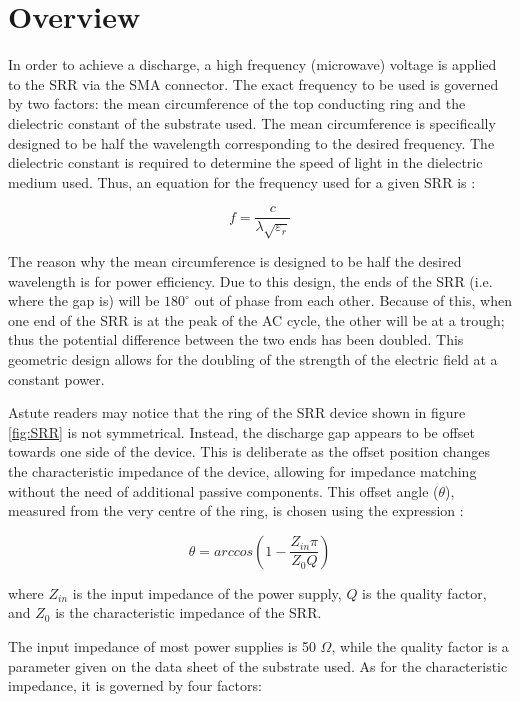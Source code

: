 \section{Overview}


In order to achieve a discharge, a high frequency (microwave) voltage is applied to the SRR via the SMA connector. The exact frequency to be used is governed by two factors: the mean circumference of the top conducting ring and the dielectric constant of the substrate used. The mean circumference is specifically designed to be half the wavelength corresponding to the desired frequency. The dielectric constant is required to determine the speed of light in the dielectric medium used. Thus, an equation for the frequency used for a given SRR is \cite{Dextre2017}:

\begin{equation}
     f = \frac{c}{\lambda\sqrt{\varepsilon_r}}
     \label{eq:resonant_frequency}
\end{equation}

The reason why the mean circumference is designed to be half the desired wavelength is for power efficiency. Due to this design, the ends of the SRR (i.e. where the gap is) will be $180^\circ$ out of phase from each other. Because of this, when one end of the SRR is at the peak of the AC cycle, the other will be at a trough; thus the potential difference between the two ends has been doubled. This geometric design allows for the doubling of the strength of the electric field at a constant power. 

Astute readers may notice that the ring of the SRR device shown in figure \ref{fig:SRR} is not symmetrical. Instead, the discharge gap appears to be offset towards one side of the device. This is deliberate as the offset position changes the characteristic impedance of the device, allowing for impedance matching without the need of additional passive components. This offset angle ($\theta$),  measured from the very centre of the ring, is chosen using the expression \cite{Iza2005}:

\begin{equation}
	\theta = arccos(1 - \frac{Z_{in} \pi}{Z_0 Q})
	\label{eq:offset_angle}
\end{equation}

where $Z_{in}$ is the input impedance of the power supply, $Q$ is the quality factor, and $Z_0$ is the characteristic impedance of the SRR. 

The input impedance of most power supplies is 50 $\Omega$, while the quality factor is a parameter given on the data sheet of the substrate used. As for the characteristic impedance, it is governed by four factors:

